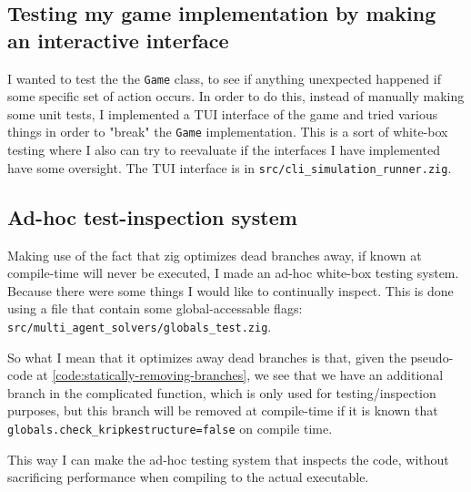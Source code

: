 \subsection{Testing my game implementation by making an interactive interface}
I wanted to test the the {\tt Game} class, to see if anything unexpected happened if some specific set of action occurs. In order to do this, instead of manually making some unit tests, I implemented a TUI interface of the game and tried various things in order to "break" the {\tt Game} implementation. This is a sort of white-box testing where I also can try to reevaluate if the interfaces I have implemented have some oversight. The TUI interface is in {\tt src/cli\_simulation\_runner.zig}.


\subsection{Ad-hoc test-inspection system}
Making use of the fact that zig optimizes dead branches away, if known at compile-time will never be executed, I made an ad-hoc white-box testing system. Because there were some things I would like to continually inspect. This is done using a file that contain some global-accessable flags: {\tt src/multi\_agent\_solvers/globals\_test.zig}.

So what I mean that it optimizes away dead branches is that, given the pseudo-code at \ref{code:statically-removing-branches}, we see that we have an additional branch in the complicated function, which is only used for testing/inspection purposes, but this branch will be removed at compile-time if it is known that {\tt globals.check\_kripkestructure=false} on compile time.

This way I can make the ad-hoc testing system that inspects the code, without sacrificing performance when compiling to the actual executable.

\begin{verbbox}
function some_complicated_function(game, kripkestructure):
    if(globals.check_kripkestructure){
        for each element in kripkestructure{
            print(element)
        }
    }
    // function continues to do other work
}
\end{verbbox}
{\centering
\fbox{\theverbbox}
\par
\label{code:statically-removing-branches}
}
